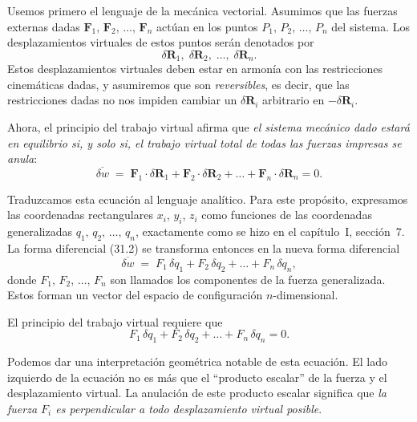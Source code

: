 Usemos primero el lenguaje de la mecánica vectorial. Asumimos que las fuerzas externas dadas $\mathbf{F}_1,\, \mathbf{F}_2,\, \ldots,\, \mathbf{F}_n$ actúan en los puntos $P_1,\, P_2,\, \ldots,\, P_n$ del sistema. Los desplazamientos virtuales de estos puntos serán denotados por
\begin{equation}
\delta\mathbf{R}_1,\; \delta\mathbf{R}_2,\; \ldots,\; \delta\mathbf{R}_n. \tag{31.1}
\end{equation}
Estos desplazamientos virtuales deben estar en armonía con las restricciones cinemáticas dadas, y asumiremos que son \emph{reversibles}, es decir, que las restricciones dadas no nos impiden cambiar un $\delta\mathbf{R}_i$ arbitrario en $-\delta\mathbf{R}_i$.

Ahora, el principio del trabajo virtual afirma que \emph{el sistema mecánico dado estará en equilibrio si, y solo si, el trabajo virtual total de todas las fuerzas impresas se anula}:
\begin{equation}
\overline{\delta w} \;=\; \mathbf{F}_1 \cdot \delta\mathbf{R}_1 + \mathbf{F}_2 \cdot \delta\mathbf{R}_2 + \ldots + \mathbf{F}_n \cdot \delta\mathbf{R}_n = 0. \tag{31.2}
\end{equation}

Traduzcamos esta ecuación al lenguaje analítico. Para este propósito, expresamos las coordenadas rectangulares $x_i$, $y_i$, $z_i$ como funciones de las coordenadas generalizadas $q_1,\, q_2,\, \ldots,\, q_n$, exactamente como se hizo en el capítulo~I, sección~7. La forma diferencial (31.2) se transforma entonces en la nueva forma diferencial
\begin{equation}
\overline{\delta w} \;=\; F_1\,\delta q_1 + F_2\,\delta q_2 + \ldots + F_n\,\delta q_n, \tag{31.3}
\end{equation}
donde $F_1,\, F_2,\, \ldots,\, F_n$ son llamados los componentes de la fuerza generalizada. Estos forman un vector del espacio de configuración $n$-dimensional.

El principio del trabajo virtual requiere que
\begin{equation}
F_1\,\delta q_1 + F_2\,\delta q_2 + \ldots + F_n\,\delta q_n = 0. \tag{31.4}
\end{equation}

Podemos dar una interpretación geométrica notable de esta ecuación. El lado izquierdo de la ecuación no es más que el ``producto escalar'' de la fuerza y el desplazamiento virtual. La anulación de este producto escalar significa que \emph{la fuerza $F_i$ es perpendicular a todo desplazamiento virtual posible}.

